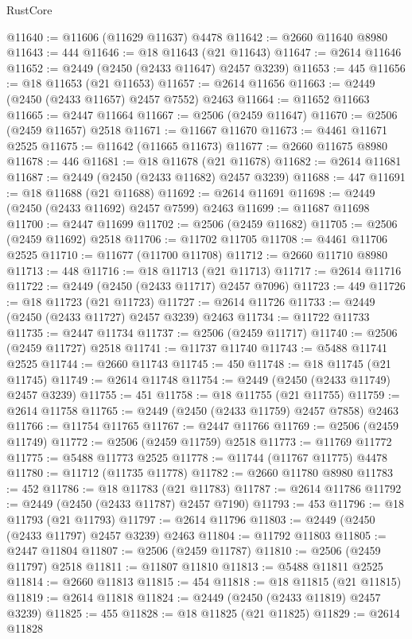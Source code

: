 \begin{lexlean}{RustCore}
\begin{coremodule}
@11640 := @11606 (@11629 @11637) @4478
@11642 := @2660 @11640 @8980
@11643 := 444
@11646 := @18 @11643 (@21 @11643)
@11647 := @2614 @11646
@11652 := @2449 (@2450 (@2433 @11647) @2457 @3239)
@11653 := 445
@11656 := @18 @11653 (@21 @11653)
@11657 := @2614 @11656
@11663 := @2449 (@2450 (@2433 @11657) @2457 @7552) @2463
@11664 := @11652 @11663
@11665 := @2447 @11664
@11667 := @2506 (@2459 @11647)
@11670 := @2506 (@2459 @11657) @2518
@11671 := @11667 @11670
@11673 := @4461 @11671 @2525
@11675 := @11642 (@11665 @11673)
@11677 := @2660 @11675 @8980
@11678 := 446
@11681 := @18 @11678 (@21 @11678)
@11682 := @2614 @11681
@11687 := @2449 (@2450 (@2433 @11682) @2457 @3239)
@11688 := 447
@11691 := @18 @11688 (@21 @11688)
@11692 := @2614 @11691
@11698 := @2449 (@2450 (@2433 @11692) @2457 @7599) @2463
@11699 := @11687 @11698
@11700 := @2447 @11699
@11702 := @2506 (@2459 @11682)
@11705 := @2506 (@2459 @11692) @2518
@11706 := @11702 @11705
@11708 := @4461 @11706 @2525
@11710 := @11677 (@11700 @11708)
@11712 := @2660 @11710 @8980
@11713 := 448
@11716 := @18 @11713 (@21 @11713)
@11717 := @2614 @11716
@11722 := @2449 (@2450 (@2433 @11717) @2457 @7096)
@11723 := 449
@11726 := @18 @11723 (@21 @11723)
@11727 := @2614 @11726
@11733 := @2449 (@2450 (@2433 @11727) @2457 @3239) @2463
@11734 := @11722 @11733
@11735 := @2447 @11734
@11737 := @2506 (@2459 @11717)
@11740 := @2506 (@2459 @11727) @2518
@11741 := @11737 @11740
@11743 := @5488 @11741 @2525
@11744 := @2660 @11743
@11745 := 450
@11748 := @18 @11745 (@21 @11745)
@11749 := @2614 @11748
@11754 := @2449 (@2450 (@2433 @11749) @2457 @3239)
@11755 := 451
@11758 := @18 @11755 (@21 @11755)
@11759 := @2614 @11758
@11765 := @2449 (@2450 (@2433 @11759) @2457 @7858) @2463
@11766 := @11754 @11765
@11767 := @2447 @11766
@11769 := @2506 (@2459 @11749)
@11772 := @2506 (@2459 @11759) @2518
@11773 := @11769 @11772
@11775 := @5488 @11773 @2525
@11778 := @11744 (@11767 @11775) @4478
@11780 := @11712 (@11735 @11778)
@11782 := @2660 @11780 @8980
@11783 := 452
@11786 := @18 @11783 (@21 @11783)
@11787 := @2614 @11786
@11792 := @2449 (@2450 (@2433 @11787) @2457 @7190)
@11793 := 453
@11796 := @18 @11793 (@21 @11793)
@11797 := @2614 @11796
@11803 := @2449 (@2450 (@2433 @11797) @2457 @3239) @2463
@11804 := @11792 @11803
@11805 := @2447 @11804
@11807 := @2506 (@2459 @11787)
@11810 := @2506 (@2459 @11797) @2518
@11811 := @11807 @11810
@11813 := @5488 @11811 @2525
@11814 := @2660 @11813
@11815 := 454
@11818 := @18 @11815 (@21 @11815)
@11819 := @2614 @11818
@11824 := @2449 (@2450 (@2433 @11819) @2457 @3239)
@11825 := 455
@11828 := @18 @11825 (@21 @11825)
@11829 := @2614 @11828

\end{coremodule}
\end{lexlean}
